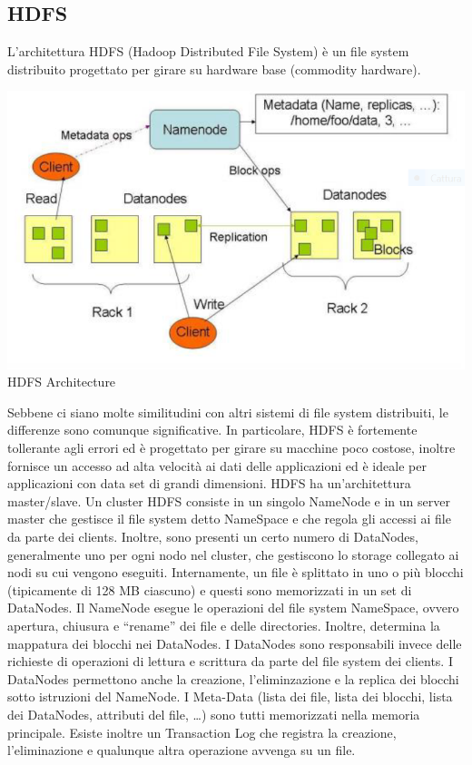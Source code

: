 \documentclass[a4page, 11pt]{article}
\begin{document}
\subsection{HDFS}
L’architettura HDFS (Hadoop Distributed File System) è un file system distribuito progettato per girare su hardware base (commodity hardware).
\begin{center}
	\includegraphics[scale=0.70]{IMAGE7.png}\\
	HDFS Architecture
\end{center}
Sebbene ci siano molte similitudini con altri sistemi di file system distribuiti, le differenze sono comunque significative. In particolare, HDFS è fortemente tollerante agli errori
ed è progettato per girare su macchine poco costose, inoltre fornisce un accesso ad alta velocità ai dati delle applicazioni ed è ideale per applicazioni con data set di grandi dimensioni. HDFS ha un’architettura master/slave. Un cluster HDFS consiste in un singolo NameNode e in un server master che gestisce il file system detto NameSpace e che regola gli accessi ai file da parte dei clients. Inoltre, sono presenti un certo numero di DataNodes, generalmente uno per ogni nodo nel cluster, che gestiscono lo storage collegato ai nodi su cui vengono eseguiti. Internamente, un file è splittato in uno o più blocchi (tipicamente di 128 MB ciascuno) e questi sono memorizzati in un set di DataNodes. Il NameNode esegue le operazioni del file system NameSpace, ovvero apertura, chiusura e “rename” dei file e delle directories. Inoltre, determina la mappatura dei blocchi nei DataNodes. I DataNodes sono responsabili invece delle richieste di operazioni di lettura e scrittura da parte del file system dei clients. I DataNodes permettono anche la creazione, l’eliminzazione e la replica dei blocchi sotto istruzioni del NameNode. I Meta-Data (lista dei file, lista dei blocchi, lista dei DataNodes, attributi del file, …) sono tutti memorizzati nella memoria principale. Esiste inoltre un Transaction Log che registra la creazione, l’eliminazione e qualunque altra operazione avvenga su un file.
\end{document}
